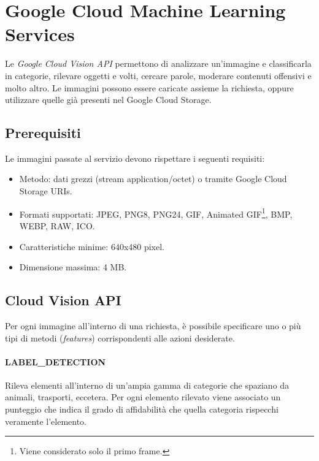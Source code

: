 
\section{Google Cloud Machine Learning Services}
Le \textit{Google Cloud Vision API} \cite{google-api} permettono di analizzare un'immagine e classificarla in categorie, rilevare oggetti e volti, cercare parole,
moderare contenuti offensivi e molto altro. Le immagini possono essere caricate assieme la richiesta, oppure utilizzare quelle già presenti nel Google Cloud Storage.

\subsection{Prerequisiti}
Le immagini passate al servizio devono rispettare i seguenti requisiti:
\begin{itemize}
\item Metodo: dati grezzi (stream application/octet) o tramite Google Cloud Storage URIs.
\item Formati supportati: JPEG, PNG8, PNG24, GIF, Animated GIF\footnote{Viene considerato solo il primo frame.},
BMP, WEBP, RAW, ICO.
\item Caratteristiche minime: 640x480 pixel.
\item Dimensione massima: 4 MB.
\end{itemize}

\subsection{Cloud Vision API}
Per ogni immagine all'interno di una richiesta, è possibile specificare uno o più tipi di metodi (\textit{features}) corrispondenti alle azioni desiderate.
\paragraph{\textsf{LABEL\_DETECTION}} Rileva elementi all'interno di un'ampia gamma di categorie che spaziano da animali, trasporti, eccetera.
Per ogni elemento rilevato viene associato un punteggio che indica il grado di affidabilità che quella categoria rispecchi veramente l'elemento.
%
